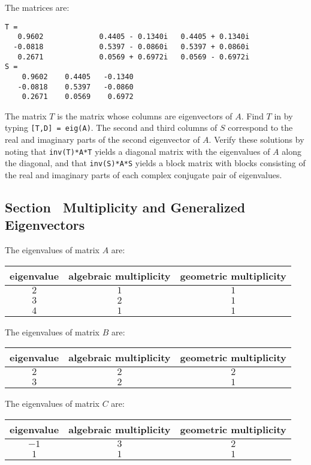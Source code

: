 \ans The matrices are:
\begin{verbatim}
T =
   0.9602             0.4405 - 0.1340i   0.4405 + 0.1340i
  -0.0818             0.5397 - 0.0860i   0.5397 + 0.0860i
   0.2671             0.0569 + 0.6972i   0.0569 - 0.6972i
S =
    0.9602    0.4405   -0.1340
   -0.0818    0.5397   -0.0860
    0.2671    0.0569    0.6972
\end{verbatim}

\soln The matrix $T$ is the matrix whose columns are eigenvectors of $A$. 
Find $T$ in \Matlab by typing {\tt [T,D] = eig(A)}.  The second and third columns
of $S$ correspond to the real and imaginary parts of the second eigenvector
of $A$.  Verify these solutions by noting that
{\tt inv(T)*A*T} yields a diagonal matrix with the eigenvalues of $A$
along the diagonal, and that {\tt inv(S)*A*S} yields a block matrix
with blocks consisting of the real and imaginary parts of each complex
conjugate pair of eigenvalues.


\subsection*{Section~\protect{\ref{S:MGE}} Multiplicity and Generalized Eigenvectors}

 The eigenvalues of matrix $A$ are:
\begin{center}
\begin{tabular}{|c|c|c|}
\hline
eigenvalue & algebraic multiplicity & geometric multiplicity \\
\hline
$2$ & $1$ & $1$ \\
$3$ & $2$ & $1$ \\
$4$ & $1$ & $1$ \\
\hline
\end{tabular}
\end{center}


 The eigenvalues of matrix $B$ are:
\begin{center}
\begin{tabular}{|c|c|c|}
\hline
eigenvalue & algebraic multiplicity & geometric multiplicity \\
\hline
$2$ & $2$ & $2$ \\
$3$ & $2$ & $1$ \\
\hline
\end{tabular}
\end{center}

 The eigenvalues of matrix $C$ are:
\begin{center}
\begin{tabular}{|c|c|c|}
\hline
eigenvalue & algebraic multiplicity & geometric multiplicity \\
\hline
$-1$ & $3$ & $2$ \\
$1$ & $1$ & $1$ \\
\hline
\end{tabular}
\end{center}

